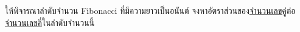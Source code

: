 \question{}

ให้พิจารณาลำดับจำนวน Fibonacci ที่มีความยาวเป็นอนันต์\;
จงหาอัตราส่วนของ\uline{จำนวนเลขคู่}ต่อ\uline{จำนวนเลขคี่}ในลำดับจำนวนนี้
